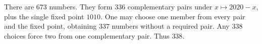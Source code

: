 There are $673$ numbers. They form $336$ complementary pairs under $x\mapsto2020-x$, plus the single fixed point $1010$. One may choose one member from every pair and the fixed point, obtaining $337$ numbers without a required pair. Any $338$ choices force two from one complementary pair. Thus $\boxed{338}$.
